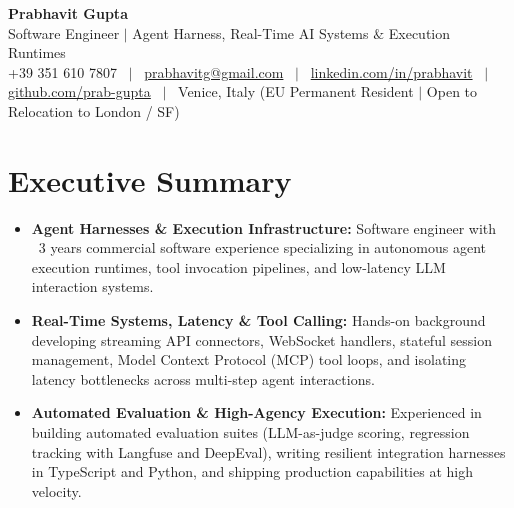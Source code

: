 \documentclass[a4paper,10pt]{article}
\begin{document}
\begin{minipage}[c]{0.80\textwidth}
  {\Huge\bfseries Prabhavit Gupta}\\[3pt]
  {\color{accent}\large Software Engineer $\vert$ Agent Harness, Real-Time AI Systems $\&$ Execution Runtimes}\\[6pt]
  {\footnotesize +39 351 610 7807 ~$\vert$~
  \href{mailto:prabhavitg@gmail.com}{prabhavitg@gmail.com} ~$\vert$~
  \href{https://www.linkedin.com/in/prabhavit/}{linkedin.com/in/prabhavit} ~$\vert$~
  \href{https://github.com/prab-gupta}{github.com/prab-gupta} ~$\vert$~
  Venice, Italy (EU Permanent Resident $\vert$ Open to Relocation to London / SF)}
\end{minipage}\hfill

\vspace{6pt}

\section{Executive Summary}
\begin{itemize}
  \item \textbf{Agent Harnesses \& Execution Infrastructure:} Software engineer with ~3 years commercial software experience specializing in autonomous agent execution runtimes, tool invocation pipelines, and low-latency LLM interaction systems.
  \item \textbf{Real-Time Systems, Latency \& Tool Calling:} Hands-on background developing streaming API connectors, WebSocket handlers, stateful session management, Model Context Protocol (MCP) tool loops, and isolating latency bottlenecks across multi-step agent interactions.
  \item \textbf{Automated Evaluation \& High-Agency Execution:} Experienced in building automated evaluation suites (LLM-as-judge scoring, regression tracking with Langfuse and DeepEval), writing resilient integration harnesses in TypeScript and Python, and shipping production capabilities at high velocity.
\end{itemize}

\end{document}
